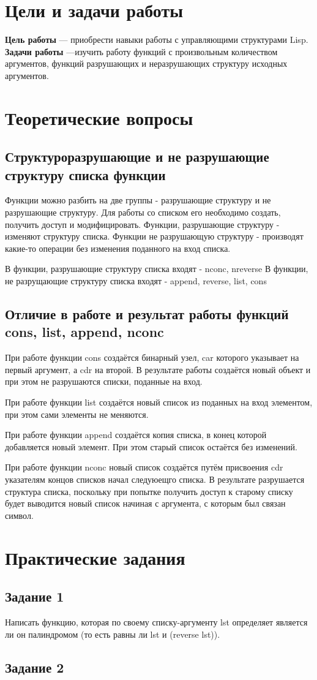 \chapter{Цели и задачи работы}
\textbf{Цель работы} --- приобрести навыки работы с управляющими структурами Lisp.
\textbf{Задачи работы} ---изучить работу функций с произвольным количеством аргументов, функций
разрушающих и неразрушающих структуру исходных аргументов.

\chapter{Теоретические вопросы}
\section{Структуроразрушающие и не разрушающие структуру списка функции}
Функции можно разбить на две группы - разрушающие структуру и не разрушающие структуру. Для работы со списком его необходимо создать, получить доступ и модифицировать. Функции, разрушающие структуру - изменяют структуру списка. Функции не разрушающую структуру - производят какие-то операции без изменения поданного на вход списка.

В функции, разрушающие структуру списка входят - nconc, nreverse
В функции, не разрущающие структуру списка входят - append, reverse, list, cons
\section{Отличие в работе и результат работы функций cons, list, append, nconc}
При работе функции cons создаётся бинарный узел, car которого указывает на первый аргумент, а cdr на второй. В результате работы создаётся новый объект и при этом не разрушаются списки, поданные на вход. 

При работе функции list создаётся новый список из поданных на вход элементом, при этом сами элементы не меняются.

При работе функции append создаётся копия списка, в конец которой добавляется новый элемент. При этом старый список остаётся без изменений.

При работе функции nconc новый список создаётся путём присвоения cdr указателям концов списков начал следуюещго списка. В результате разрушается структура списка, поскольку при попытке получить доступ к старому списку будет выводится новый список начиная с аргумента, с которым был связан символ.

\chapter{Практические задания}
\section{Задание 1}
Написать функцию, которая по своему списку-аргументу lst определяет является ли он палиндромом (то есть равны ли lst и (reverse lst)).

\section{Задание 2}